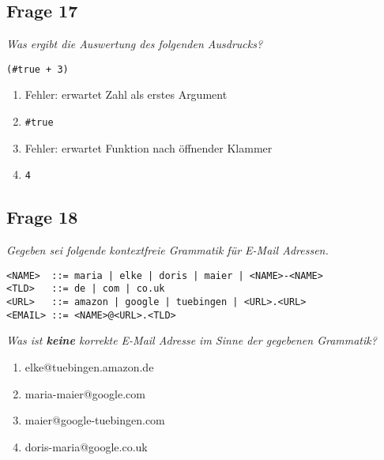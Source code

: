 \documentclass[a4paper, 11pt]{article}
\begin{document}
\subsection*{Frage 17}
\textit{Was ergibt die Auswertung des folgenden Ausdrucks?}
\begin{verbatim}
(#true + 3)
\end{verbatim}
\begin{enumerate}[label=$\square$]
	\item Fehler: erwartet Zahl als erstes Argument
	\item \texttt{\#true}
	\item Fehler: erwartet Funktion nach öffnender Klammer
	\item \texttt{4}
\end{enumerate}

\subsection*{Frage 18}
\textit{Gegeben sei folgende kontextfreie Grammatik für E-Mail Adressen.}
\begin{verbatim}
<NAME>  ::= maria | elke | doris | maier | <NAME>-<NAME>
<TLD>   ::= de | com | co.uk
<URL>   ::= amazon | google | tuebingen | <URL>.<URL>
<EMAIL> ::= <NAME>@<URL>.<TLD>
\end{verbatim}
\textit{Was ist \textbf{keine} korrekte E-Mail Adresse im Sinne der gegebenen Grammatik?}
\begin{enumerate}[label=$\square$]
	\item elke@tuebingen.amazon.de
	\item maria-maier@google.com
	\item maier@google-tuebingen.com
	\item doris-maria@google.co.uk
\end{enumerate}
\end{document}
